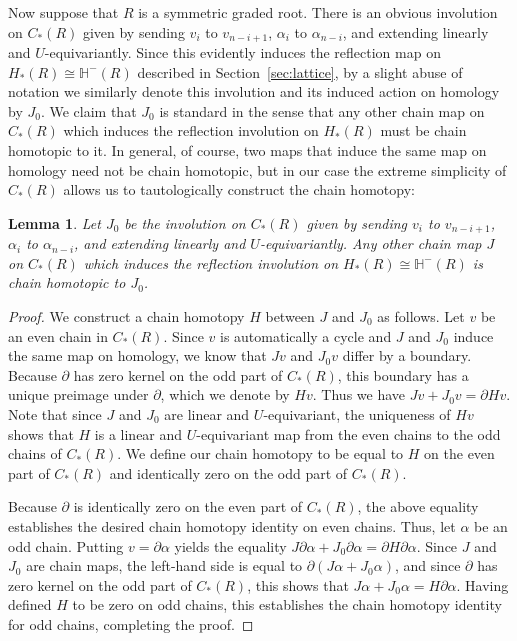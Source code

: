 \documentclass[11 pt]{amsart}
\newtheorem {lemma}[theorem]{Lemma}
\theoremstyle{remark}
\def\He{\mathbb{H}}
\begin{document}
Now suppose that $R$ is a symmetric graded root. There is an obvious involution on $C_*(R)$ given by sending $v_i$ to $v_{n-i+1}$, $\alpha_i$ to $\alpha_{n-i}$, and extending linearly and $U$-equivariantly. Since this evidently induces the reflection map on $H_*(R) \cong \He^-(R)$ described in Section~\ref{sec:lattice}, by a slight abuse of notation we similarly denote this involution and its induced action on homology by $J_0$. We claim that $J_0$ is standard in the sense that any other chain map on $C_*(R)$ which induces the reflection involution on $H_*(R)$ must be chain homotopic to it. In general, of course, two maps that induce the same map on homology need not be chain homotopic, but in our case the extreme simplicity of $C_*(R)$ allows us to tautologically construct the chain homotopy:
\begin{lemma}\label{lemgraded2}
Let $J_0$ be the involution on $C_*(R)$ given by sending $v_i$ to $v_{n-i+1}$, $\alpha_i$ to $\alpha_{n-i}$, and extending linearly and $U$-equivariantly. Any other chain map $J$ on $C_*(R)$ which induces the reflection involution on $H_*(R) \cong \He^-(R)$ is chain homotopic to $J_0$.
\end{lemma}
\begin{proof}
We construct a chain homotopy $H$ between $J$ and $J_0$ as follows. Let $v$ be an even chain in $C_*(R)$. Since $v$ is automatically a cycle and $J$ and $J_0$ induce the same map on homology, we know that $Jv$ and $J_0v$ differ by a boundary. Because $\partial$ has zero kernel on the odd part of $C_*(R)$, this boundary has a unique preimage under $\partial$, which we denote by $Hv$. Thus we have $Jv + J_0v = \partial Hv$. Note that since $J$ and $J_0$ are linear and $U$-equivariant, the uniqueness of $Hv$ shows that $H$ is a linear and $U$-equivariant map from the even chains to the odd chains of $C_*(R)$. We define our chain homotopy to be equal to $H$ on the even part of $C_*(R)$ and identically zero on the odd part of $C_*(R)$.  

Because $\partial$ is identically zero on the even part of $C_*(R)$, the above equality establishes the desired chain homotopy identity on even chains. Thus, let $\alpha$ be an odd chain. Putting $v = \partial \alpha$ yields the equality $J\partial \alpha + J_0\partial \alpha = \partial H\partial \alpha$. Since $J$ and $J_0$ are chain maps, the left-hand side is equal to $\partial(J\alpha + J_0\alpha)$, and since $\partial$ has zero kernel on the odd part of $C_*(R)$, this shows that $J\alpha + J_0\alpha = H\partial \alpha$. Having defined $H$ to be zero on odd chains, this establishes the chain homotopy identity for odd chains, completing the proof.
\end{proof}
\end{document}

